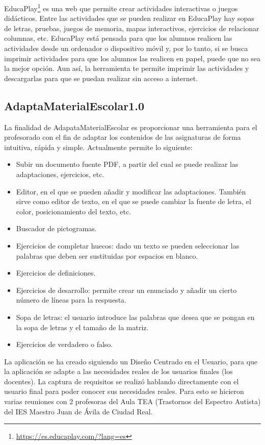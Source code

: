 EducaPlay\footnote{\url{https://es.educaplay.com/?lang=es}} es una web que permite crear actividades interactivas o juegos didácticos. Entre las actividades que se pueden realizar en EducaPlay hay sopas de letras, pruebas, juegos de memoria, mapas interactivos, ejercicios de relacionar columnas, etc. EducaPlay está pensada para que los alumnos realicen las actividades desde un ordenador o dispositivo móvil y, por lo tanto, si se busca imprimir actividades para que los alumnos las realicen en papel, puede que no sea la mejor opción. Aun así, la herramienta te permite imprimir las actividades y descargarlas para que se puedan realizar sin acceso a internet.

\subsection{AdaptaMaterialEscolar1.0}
La finalidad de AdapataMaterialEscolar es proporcionar una herramienta para el profesorado con el fin de adaptar los contenidos de las asignaturas de forma intuitiva, rápida y simple. Actualmente permite lo siguiente:
\begin{itemize}
    \item Subir un documento fuente PDF, a partir del cual se puede realizar las adaptaciones, ejercicios, etc.
    \item Editor, en el que se pueden añadir y modificar las adaptaciones. También sirve como editor de texto, en el que se puede cambiar la fuente de letra, el color, posicionamiento del texto, etc.
    \item Buscador de pictogramas.
    \item Ejercicios de completar huecos: dado un texto se pueden seleccionar las palabras que deben ser sustituidas por espacios en blanco.
    \item Ejercicios de definiciones.
    \item Ejercicios de desarrollo: permite crear un enunciado y añadir un cierto número de líneas para la respuesta.
    \item Sopa de letras: el usuario introduce las palabras que desea que se pongan en la sopa de letras y el tamaño de la matriz.
    \item Ejercicios de verdadero o falso.
\end{itemize}

La aplicación se ha creado siguiendo un Diseño Centrado en el Usuario, para que la aplicación se adapte a las necesidades reales de los usuarios finales (los docentes). La captura de requisitos se realizó hablando directamente con el usuario final para poder conocer sus necesidades reales. Para esto se hicieron varias reuniones con 2 profesoras del Aula TEA (Trastornos del Espectro Autista) del IES Maestro Juan de Ávila de Ciudad Real.


